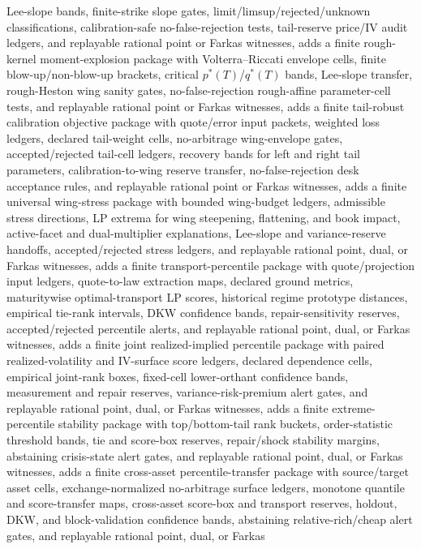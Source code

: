\documentclass[11pt]{article}
\begin{document}
Lee-slope bands, finite-strike slope gates, limit/limsup/rejected/unknown classifications,
calibration-safe no-false-rejection tests, tail-reserve price/IV audit ledgers, and replayable
rational point or Farkas witnesses, adds a finite rough-kernel moment-explosion package with
Volterra--Riccati envelope cells, finite blow-up/non-blow-up brackets, critical
\(p^*(T)\)/\(q^*(T)\) bands, Lee-slope transfer, rough-Heston wing sanity gates,
no-false-rejection rough-affine parameter-cell tests, and replayable rational point or Farkas
witnesses, adds a finite tail-robust calibration objective package with quote/error input packets,
weighted loss ledgers, declared tail-weight cells, no-arbitrage wing-envelope gates,
accepted/rejected tail-cell ledgers, recovery bands for left and right tail parameters,
calibration-to-wing reserve transfer, no-false-rejection desk acceptance rules, and replayable
rational point or Farkas witnesses, adds a finite universal wing-stress package with bounded
wing-budget ledgers, admissible stress directions, LP extrema for wing steepening, flattening, and
book impact, active-facet and dual-multiplier explanations, Lee-slope and variance-reserve handoffs,
accepted/rejected stress ledgers, and replayable rational point, dual, or Farkas witnesses, adds a
finite transport-percentile package with quote/projection input ledgers, quote-to-law extraction
maps, declared ground metrics, maturitywise optimal-transport LP scores, historical regime prototype
distances, empirical tie-rank intervals, DKW confidence bands, repair-sensitivity reserves,
accepted/rejected percentile alerts, and replayable rational point, dual, or Farkas witnesses, adds a
finite joint realized-implied percentile package with paired realized-volatility and IV-surface score
ledgers, declared dependence cells, empirical joint-rank boxes, fixed-cell lower-orthant confidence
bands, measurement and repair reserves, variance-risk-premium alert gates, and replayable rational
point, dual, or Farkas witnesses, adds a finite extreme-percentile stability package with
top/bottom-tail rank buckets, order-statistic threshold bands, tie and score-box reserves,
repair/shock stability margins, abstaining crisis-state alert gates, and replayable rational point,
dual, or Farkas witnesses, adds a finite cross-asset percentile-transfer package with source/target
asset cells, exchange-normalized no-arbitrage surface ledgers, monotone quantile and score-transfer
maps, cross-asset score-box and transport reserves, holdout, DKW, and block-validation confidence
bands, abstaining relative-rich/cheap alert gates, and replayable rational point, dual, or Farkas
\end{document}
